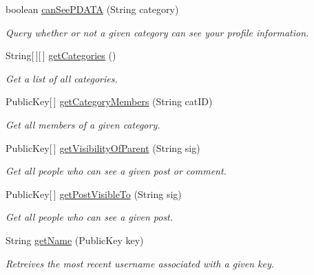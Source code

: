 \begin{DoxyCompactItemize}
boolean \hyperlink{classballmerpeak_1_1turtlenet_1_1server_1_1Database_ac51008e3d60ba40c4afa37287918a5b7}{can\-See\-P\-D\-A\-T\-A} (String category)
\begin{DoxyCompactList}\small\item\em Query whether or not a given category can see your profile information. \end{DoxyCompactList}\item 
String\mbox{[}$\,$\mbox{]}\mbox{[}$\,$\mbox{]} \hyperlink{classballmerpeak_1_1turtlenet_1_1server_1_1Database_a7f615f18361634692adff5e59c428d84}{get\-Categories} ()
\begin{DoxyCompactList}\small\item\em Get a list of all categories. \end{DoxyCompactList}\item 
Public\-Key\mbox{[}$\,$\mbox{]} \hyperlink{classballmerpeak_1_1turtlenet_1_1server_1_1Database_ad6939a97222c8e7da39726b181220aff}{get\-Category\-Members} (String cat\-I\-D)
\begin{DoxyCompactList}\small\item\em Get all members of a given category. \end{DoxyCompactList}\item 
Public\-Key\mbox{[}$\,$\mbox{]} \hyperlink{classballmerpeak_1_1turtlenet_1_1server_1_1Database_a9e36a1c14ff02a2cc43b38a646ee20ab}{get\-Visibility\-Of\-Parent} (String sig)
\begin{DoxyCompactList}\small\item\em Get all people who can see a given post or comment. \end{DoxyCompactList}\item 
Public\-Key\mbox{[}$\,$\mbox{]} \hyperlink{classballmerpeak_1_1turtlenet_1_1server_1_1Database_a0ccbad682720c86cb152de04a7052332}{get\-Post\-Visible\-To} (String sig)
\begin{DoxyCompactList}\small\item\em Get all people who can see a given post. \end{DoxyCompactList}\item 
String \hyperlink{classballmerpeak_1_1turtlenet_1_1server_1_1Database_a102153ec0531bc6be459d0879c78051d}{get\-Name} (Public\-Key key)
\begin{DoxyCompactList}\small\item\em Retreives the most recent username associated with a given key. \end{DoxyCompactList}\item 

\end{DoxyCompactItemize}
